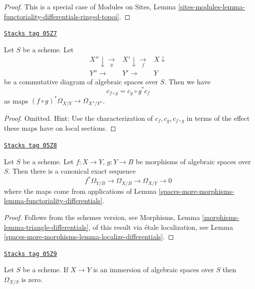 \begin{proof}
This is a special case of
Modules on Sites, Lemma
\ref{sites-modules-lemma-functoriality-differentials-ringed-topoi}.
\end{proof}

\begin{lemma}
\label{spaces-more-morphisms-lemma-check-functoriality-differentials}
\href{https://stacks.math.columbia.edu/tag/05Z7}{\texttt{Stacks tag 05Z7}}

Let $S$ be a scheme. Let
$$
\begin{array}{ccc}X'' \downarrow\underset{g}{\longrightarrow} & X' \downarrow\underset{f}{\longrightarrow} & X \downarrow \\ Y'' \longrightarrow & Y' \longrightarrow & Y\end{array}
$$
be a commutative diagram of algebraic spaces over $S$. Then we have
$$
c_{f \circ g} = c_g \circ g^* c_f
$$
as maps $(f \circ g)^*\Omega_{X/Y} \to \Omega_{X''/Y''}$.
\end{lemma}

\begin{proof}
Omitted. Hint: Use the characterization of $c_f, c_g, c_{f \circ g}$
in terms of the effect these maps have on local sections.
\end{proof}

\begin{lemma}
\label{spaces-more-morphisms-lemma-triangle-differentials}
\href{https://stacks.math.columbia.edu/tag/05Z8}{\texttt{Stacks tag 05Z8}}

Let $S$ be a scheme.
Let $f : X \to Y$, $g : Y \to B$ be morphisms of algebraic spaces over $S$.
Then there is a canonical exact sequence
$$
f^*\Omega_{Y/B} \to \Omega_{X/B} \to \Omega_{X/Y} \to 0
$$
where the maps come from applications of
Lemma \ref{spaces-more-morphisms-lemma-functoriality-differentials}.
\end{lemma}

\begin{proof}
Follows from the schemes version, see
Morphisms, Lemma \ref{morphisms-lemma-triangle-differentials},
of this result via \'etale localization, see
Lemma \ref{spaces-more-morphisms-lemma-localize-differentials}.
\end{proof}

\begin{lemma}
\label{spaces-more-morphisms-lemma-immersion-differentials}
\href{https://stacks.math.columbia.edu/tag/05Z9}{\texttt{Stacks tag 05Z9}}

Let $S$ be a scheme. If $X \to Y$ is an immersion
of algebraic spaces over $S$ then $\Omega_{X/S}$ is zero.
\end{lemma}

